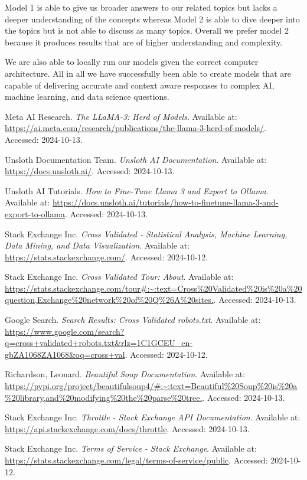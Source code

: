 \documentclass[10pt]{article}
\begin{document}
Model 1 is able to give us broader answers to our related topics but lacks a
deeper understanding of the concepts whereas Model 2 is able to dive deeper
into the topics but is not able to discuss as many topics. 
Overall we prefer model 2 because it produces results that are
of higher understanding and complexity.

We are also able to locally run our models given the correct computer architecture. 
All in all we have successfully been able to create models that are capable of delivering
accurate and context aware responses to complex AI, machine learning, and data science questions.

\begin{thebibliography}{9}
\small

Meta AI Research. \textit{The LLaMA-3: Herd of Models}. Available at: \url{https://ai.meta.com/research/publications/the-llama-3-herd-of-models/}. Accessed: 2024-10-13.

Unsloth Documentation Team. \textit{Unsloth AI Documentation}. Available at: \url{https://docs.unsloth.ai/}. Accessed: 2024-10-13.

Unsloth AI Tutorials. \textit{How to Fine-Tune Llama 3 and Export to Ollama}. Available at: \url{https://docs.unsloth.ai/tutorials/how-to-finetune-llama-3-and-export-to-ollama}. Accessed: 2024-10-13.

Stack Exchange Inc. \textit{Cross Validated - Statistical Analysis, Machine Learning, Data Mining, and Data Visualization}. Available at: \url{https://stats.stackexchange.com/}. Accessed: 2024-10-12.

Stack Exchange Inc. \textit{Cross Validated Tour: About}. Available at: \url{https://stats.stackexchange.com/tour#:~:text=Cross%20Validated%20is%20a%20question,Exchange%20network%20of%20Q\%26A\%20sites.}. Accessed: 2024-10-13.

Google Search. \textit{Search Results: Cross Validated robots.txt}. Available at: \url{https://www.google.com/search?q=cross+validated+robots.txt&rlz=1C1GCEU_en-gbZA1068ZA1068&oq=cross+val}. Accessed: 2024-10-12.

Richardson, Leonard. \textit{Beautiful Soup Documentation}. Available at: \url{https://pypi.org/project/beautifulsoup4/#:~:text=Beautiful%20Soup%20is%20a%20library,and%20modifying%20the%20parse%20tree.}. Accessed: 2024-10-13.

Stack Exchange Inc. \textit{Throttle - Stack Exchange API Documentation}. Available at: \url{https://api.stackexchange.com/docs/throttle}. Accessed: 2024-10-13.

Stack Exchange Inc. \textit{Terms of Service - Stack Exchange}. Available at: \url{https://stats.stackexchange.com/legal/terms-of-service/public}. Accessed: 2024-10-12.

\end{thebibliography}
\end{document}
